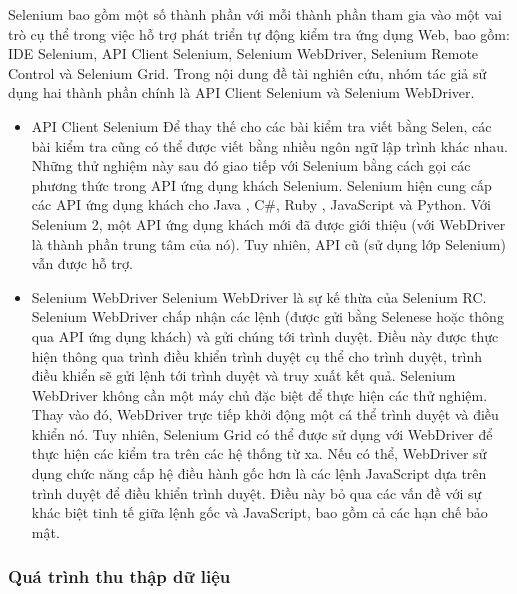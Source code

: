 Selenium bao gồm một số thành phần với mỗi thành phần tham gia vào một vai trò cụ thể trong việc hỗ trợ phát triển tự động kiểm tra ứng dụng Web, bao gồm: IDE Selenium, API Client Selenium, Selenium WebDriver, Selenium Remote Control và Selenium Grid. Trong nội dung đề tài nghiên cứu, nhóm tác giả sử dụng hai thành phần chính là API Client Selenium và Selenium WebDriver.

\begin{itemize}
	\item API Client Selenium
	Để thay thế cho các bài kiểm tra viết bằng Selen, các bài kiểm tra cũng có thể được viết bằng nhiều ngôn ngữ lập trình khác nhau. Những thử nghiệm này sau đó giao tiếp với Selenium bằng cách gọi các phương thức trong API ứng dụng khách Selenium. Selenium hiện cung cấp các API ứng dụng khách cho Java , C\#, Ruby , JavaScript và Python. Với Selenium 2, một API ứng dụng khách mới đã được giới thiệu (với WebDriver là thành phần trung tâm của nó). Tuy nhiên, API cũ (sử dụng lớp Selenium) vẫn được hỗ trợ.
	
	\item Selenium WebDriver
	Selenium WebDriver là sự kế thừa của Selenium RC. Selenium WebDriver chấp nhận các lệnh (được gửi bằng Selenese hoặc thông qua API ứng dụng khách) và gửi chúng tới trình duyệt. Điều này được thực hiện thông qua trình điều khiển trình duyệt cụ thể cho trình duyệt, trình điều khiển sẽ gửi lệnh tới trình duyệt và truy xuất kết quả. Selenium WebDriver không cần một máy chủ đặc biệt để thực hiện các thử nghiệm. Thay vào đó, WebDriver trực tiếp khởi động một cá thể trình duyệt và điều khiển nó. Tuy nhiên, Selenium Grid có thể được sử dụng với WebDriver để thực hiện các kiểm tra trên các hệ thống từ xa. Nếu có thể, WebDriver sử dụng chức năng cấp hệ điều hành gốc hơn là các lệnh JavaScript dựa trên trình duyệt để điều khiển trình duyệt. Điều này bỏ qua các vấn đề với sự khác biệt tinh tế giữa lệnh gốc và JavaScript, bao gồm cả các hạn chế bảo mật.
	
\end{itemize}	
	
	\subsubsection{Quá trình thu thập dữ liệu}

